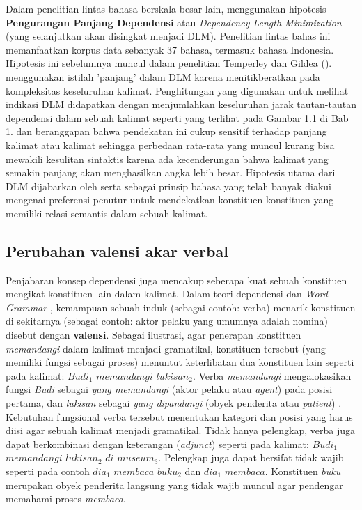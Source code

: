 Dalam penelitian lintas bahasa berskala besar lain, \cite{futrell2015large} menggunakan hipotesis \textbf{Pengurangan Panjang Dependensi} atau \textit{Dependency Length Minimization} (yang selanjutkan akan disingkat menjadi DLM). Penelitian lintas bahas ini memanfaatkan korpus data sebanyak 37 bahasa, termasuk bahasa Indonesia. Hipotesis ini sebelumnya muncul dalam penelitian Temperley dan Gildea (\citealp{temperley2007minimization, temperley2008dependency, gildea2010grammars}). \cite{gildea2010grammars} menggunakan istilah 'panjang' dalam DLM karena menitikberatkan pada kompleksitas keseluruhan kalimat. Penghitungan yang digunakan untuk melihat indikasi DLM didapatkan dengan menjumlahkan keseluruhan jarak tautan-tautan dependensi dalam sebuah kalimat seperti yang terlihat pada Gambar 1.1 di Bab 1. \cite{liu2017dependency} dan \cite{i2004euclidean} beranggapan bahwa pendekatan ini cukup sensitif terhadap panjang kalimat atau kalimat sehingga perbedaan rata-rata yang muncul kurang bisa mewakili kesulitan sintaktis karena ada kecenderungan bahwa kalimat yang semakin panjang akan menghasilkan angka lebih besar. Hipotesis utama dari DLM dijabarkan oleh \cite{gildea2010grammars} serta \cite{futrell2015large} sebagai prinsip bahasa yang telah banyak diakui mengenai preferensi penutur untuk mendekatkan konstituen-konstituen yang memiliki relasi semantis dalam sebuah kalimat.

\subsection{Perubahan valensi akar verbal}
Penjabaran konsep dependensi juga mencakup seberapa kuat sebuah konstituen mengikat konstituen lain dalam kalimat. Dalam teori dependensi \citep{tesniere1959elements} dan \textit{Word Grammar} \citep{hudson2007language}, kemampuan sebuah induk (sebagai contoh: verba) menarik konstituen di sekitarnya (sebagai contoh: aktor pelaku yang umumnya adalah nomina) disebut dengan \textbf{valensi}. Sebagai ilustrasi, agar penerapan konstituen \textit{memandangi} dalam kalimat menjadi gramatikal, konstituen tersebut (yang memiliki fungsi sebagai proses) menuntut keterlibatan dua konstituen lain seperti pada kalimat: $Budi_1$ $memandangi$ $lukisan_2$. Verba \textit{memandangi} mengalokasikan fungsi \textit{Budi} sebagai \textit{yang memandangi} (aktor pelaku atau \textit{agent}) pada posisi pertama, dan \textit{lukisan} sebagai \textit{yang dipandangi} (obyek penderita atau \textit{patient}) \citep{welke2002deutsche}. Kebutuhan fungsional verba tersebut menentukan kategori dan posisi yang harus diisi agar sebuah kalimat menjadi gramatikal. Tidak hanya pelengkap, verba juga dapat berkombinasi dengan keterangan (\textit{adjunct}) seperti pada kalimat: $Budi_1$ $memandangi$ $lukisan_2$ $di$ $museum_3$. Pelengkap juga dapat bersifat tidak wajib seperti pada contoh $dia_1$ $membaca$ $buku_2$ dan $dia_1$ $membaca$. Konstituen \textit{buku} merupakan obyek penderita langsung yang tidak wajib muncul agar pendengar memahami proses \textit{membaca}. 

